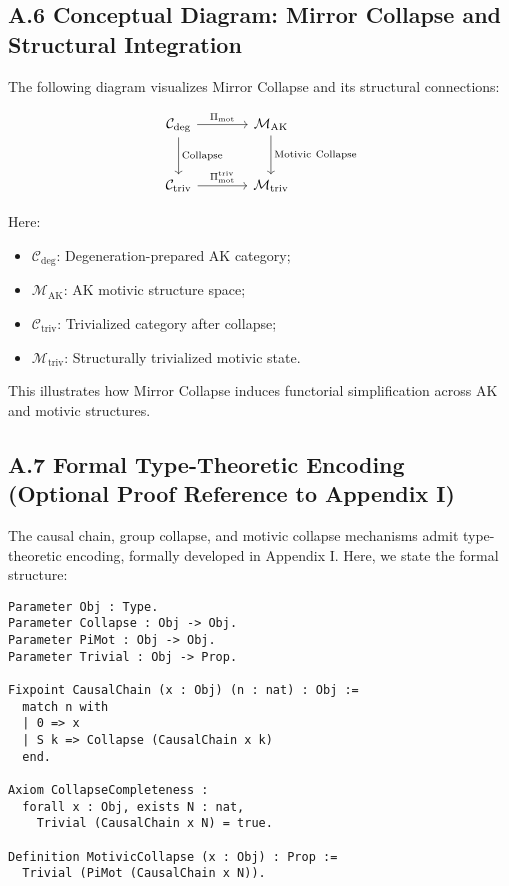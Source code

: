 \documentclass[11pt]{article}
\begin{document}
\subsection*{A.6 Conceptual Diagram: Mirror Collapse and Structural Integration}

The following diagram visualizes Mirror Collapse and its structural connections:

\[
\begin{tikzcd}[row sep=large, column sep=large]
\mathcal{C}_{\mathrm{deg}} \arrow[r, "\Pi_{\mathrm{mot}}"] \arrow[d, "\mathrm{Collapse}"]
& \mathcal{M}_{\mathrm{AK}} \arrow[d, "\mathrm{Motivic\ Collapse}"] \\
\mathcal{C}_{\mathrm{triv}} \arrow[r, "\Pi_{\mathrm{mot}}^{\mathrm{triv}}"]
& \mathcal{M}_{\mathrm{triv}}
\end{tikzcd}
\]

Here:

\begin{itemize}
    \item $\mathcal{C}_{\mathrm{deg}}$: Degeneration-prepared AK category;
    \item $\mathcal{M}_{\mathrm{AK}}$: AK motivic structure space;
    \item $\mathcal{C}_{\mathrm{triv}}$: Trivialized category after collapse;
    \item $\mathcal{M}_{\mathrm{triv}}$: Structurally trivialized motivic state.
\end{itemize}

This illustrates how Mirror Collapse induces functorial simplification across AK and motivic structures.

\subsection*{A.7 Formal Type-Theoretic Encoding (Optional Proof Reference to Appendix I)}

The causal chain, group collapse, and motivic collapse mechanisms admit type-theoretic encoding, formally developed in Appendix I. Here, we state the formal structure:

\begin{lstlisting}[language=Coq, caption=Causal Chain and Collapse Encoding]
Parameter Obj : Type.
Parameter Collapse : Obj -> Obj.
Parameter PiMot : Obj -> Obj.
Parameter Trivial : Obj -> Prop.

Fixpoint CausalChain (x : Obj) (n : nat) : Obj :=
  match n with
  | 0 => x
  | S k => Collapse (CausalChain x k)
  end.

Axiom CollapseCompleteness :
  forall x : Obj, exists N : nat,
    Trivial (CausalChain x N) = true.

Definition MotivicCollapse (x : Obj) : Prop :=
  Trivial (PiMot (CausalChain x N)).
\end{lstlisting}
\end{document}
